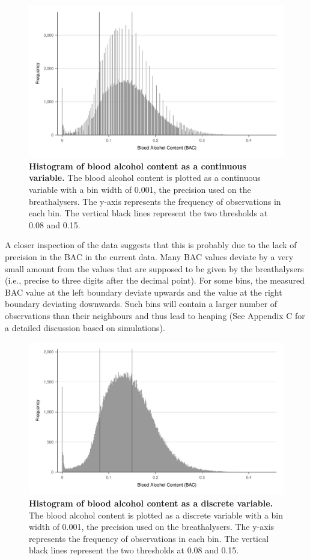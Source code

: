 \documentclass[
  11pt,
]{article}
\begin{document}
\begin{figure}[H]
  \centering
  \includegraphics[width=0.9\columnwidth]{../figures/bac_histogram_continuous.pdf}
  \caption{\textbf{Histogram of blood alcohol content as a continuous variable.} The blood alcohol content is plotted as a continuous variable with a bin width of 0.001, the precision used on the breathalysers. The y-axis represents the frequency of observations in each bin. The vertical black lines represent the two thresholds at 0.08 and 0.15.}
  \label{fig:bac_hist_continuous}
\end{figure}

A closer inspection of the data suggests that this is probably due to
the lack of precision in the BAC in the current data. Many BAC values
deviate by a very small amount from the values that are supposed to be
given by the breathalysers (i.e., precise to three digits after the
decimal point). For some bins, the measured BAC value at the left
boundary deviate upwards and the value at the right boundary deviating
downwards. Such bins will contain a larger number of observations than
their neighbours and thus lead to heaping (See Appendix C for a detailed
discussion based on simulations).

\begin{figure}[H]
  \centering
  \includegraphics[width=0.9\columnwidth]{../figures/bac_histogram_discrete.pdf}
  \caption{\textbf{Histogram of blood alcohol content as a discrete variable.} The blood alcohol content is plotted as a discrete variable with a bin width of 0.001, the precision used on the breathalysers. The y-axis represents the frequency of observations in each bin. The vertical black lines represent the two thresholds at 0.08 and 0.15.}
  \label{fig:bac_hist_discrete}
\end{figure}
\end{document}
